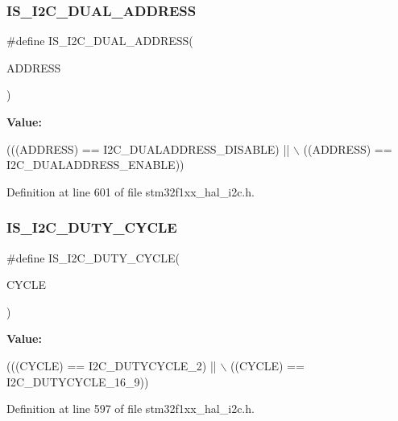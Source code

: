 \subsubsection{\texorpdfstring{I\+S\+\_\+\+I2\+C\+\_\+\+D\+U\+A\+L\+\_\+\+A\+D\+D\+R\+E\+SS}{IS\_I2C\_DUAL\_ADDRESS}}
{\footnotesize\ttfamily \#define I\+S\+\_\+\+I2\+C\+\_\+\+D\+U\+A\+L\+\_\+\+A\+D\+D\+R\+E\+SS(\begin{DoxyParamCaption}\item[{}]{A\+D\+D\+R\+E\+SS }\end{DoxyParamCaption})}

{\bfseries Value\+:}
\begin{DoxyCode}
(((ADDRESS) == I2C\_DUALADDRESS\_DISABLE) || \(\backslash\)
                                      ((ADDRESS) == I2C\_DUALADDRESS\_ENABLE))
\end{DoxyCode}


Definition at line 601 of file stm32f1xx\+\_\+hal\+\_\+i2c.\+h.

\mbox{\label{group___i2_c___i_s___r_t_c___definitions_gae9b3276d9b6ec872ee4fafa2b2fafb83}} 
\subsubsection{\texorpdfstring{I\+S\+\_\+\+I2\+C\+\_\+\+D\+U\+T\+Y\+\_\+\+C\+Y\+C\+LE}{IS\_I2C\_DUTY\_CYCLE}}
{\footnotesize\ttfamily \#define I\+S\+\_\+\+I2\+C\+\_\+\+D\+U\+T\+Y\+\_\+\+C\+Y\+C\+LE(\begin{DoxyParamCaption}\item[{}]{C\+Y\+C\+LE }\end{DoxyParamCaption})}

{\bfseries Value\+:}
\begin{DoxyCode}
(((CYCLE) == I2C\_DUTYCYCLE\_2) || \(\backslash\)
                                  ((CYCLE) == I2C\_DUTYCYCLE\_16\_9))
\end{DoxyCode}


Definition at line 597 of file stm32f1xx\+\_\+hal\+\_\+i2c.\+h.

